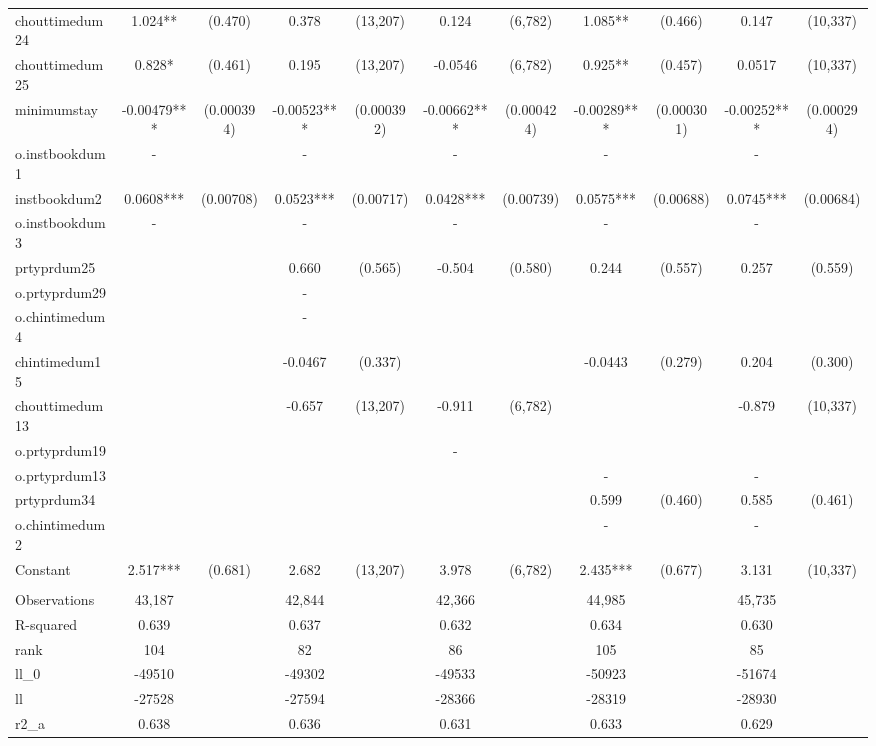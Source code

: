 \documentclass[]{article}
\begin{document}
\begin{tabular}{lcccccccccc}
chouttimedum24 & 1.024** & (0.470) & 0.378 & (13,207) & 0.124 & (6,782) & 1.085** & (0.466) & 0.147 & (10,337) \\
chouttimedum25 & 0.828* & (0.461) & 0.195 & (13,207) & -0.0546 & (6,782) & 0.925** & (0.457) & 0.0517 & (10,337) \\
minimumstay & -0.00479*** & (0.000394) & -0.00523*** & (0.000392) & -0.00662*** & (0.000424) & -0.00289*** & (0.000301) & -0.00252*** & (0.000294) \\
o.instbookdum1 & - &  & - &  & - &  & - &  & - &  \\
instbookdum2 & 0.0608*** & (0.00708) & 0.0523*** & (0.00717) & 0.0428*** & (0.00739) & 0.0575*** & (0.00688) & 0.0745*** & (0.00684) \\
o.instbookdum3 & - &  & - &  & - &  & - &  & - &  \\
prtyprdum25 &  &  & 0.660 & (0.565) & -0.504 & (0.580) & 0.244 & (0.557) & 0.257 & (0.559) \\
o.prtyprdum29 &  &  & - &  &  &  &  &  &  &  \\
o.chintimedum4 &  &  & - &  &  &  &  &  &  &  \\
chintimedum15 &  &  & -0.0467 & (0.337) &  &  & -0.0443 & (0.279) & 0.204 & (0.300) \\
chouttimedum13 &  &  & -0.657 & (13,207) & -0.911 & (6,782) &  &  & -0.879 & (10,337) \\
o.prtyprdum19 &  &  &  &  & - &  &  &  &  &  \\
o.prtyprdum13 &  &  &  &  &  &  & - &  & - &  \\
prtyprdum34 &  &  &  &  &  &  & 0.599 & (0.460) & 0.585 & (0.461) \\
o.chintimedum2 &  &  &  &  &  &  & - &  & - &  \\
Constant & 2.517*** & (0.681) & 2.682 & (13,207) & 3.978 & (6,782) & 2.435*** & (0.677) & 3.131 & (10,337) \\
 &  &  &  &  &  &  &  &  &  &  \\
Observations & 43,187 &  & 42,844 &  & 42,366 &  & 44,985 &  & 45,735 &  \\
R-squared & 0.639 &  & 0.637 &  & 0.632 &  & 0.634 &  & 0.630 &  \\
rank & 104 &  & 82 &  & 86 &  & 105 &  & 85 &  \\
ll\_0 & -49510 &  & -49302 &  & -49533 &  & -50923 &  & -51674 &  \\
ll & -27528 &  & -27594 &  & -28366 &  & -28319 &  & -28930 &  \\
r2\_a & 0.638 &  & 0.636 &  & 0.631 &  & 0.633 &  & 0.629 &  \\

\end{tabular}
\end{document}
